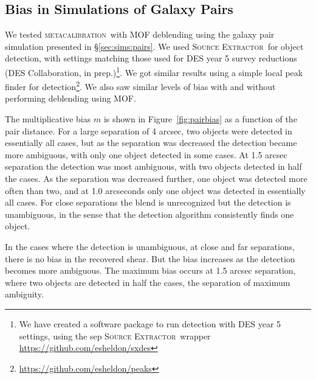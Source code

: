 \documentclass[iop, appendixfloats, numberedappendix, apj]{emulateapj}
\newcommand{\mcal}{\textsc{metacalibration}}
\newcommand{\sx}{\textsc{Source Extractor}}
\begin{document}
\subsection{Bias in Simulations of Galaxy Pairs}

We tested \mcal\ with MOF deblending using the galaxy pair simulation presented
in \S \ref{sec:sims:pairs}. We used \sx\ for object detection, with settings
matching those used for DES year 5 survey reductions (DES Collaboration, in
prep.)\footnote{We have created a software package to run detection with DES
year 5 settings, using the sep \sx\ wrapper
\url{https://github.com/esheldon/sxdes}}.  We got similar results using a
simple local peak finder for
detection\footnote{\url{https://github.com/esheldon/peaks}}.  We also saw
similar levels of bias with and without performing deblending using MOF.

The multiplicative bias $m$ is shown in Figure~\ref{fig:pairbias} as a function
of the pair distance. For a large separation of 4 arcsec, two objects were
detected in essentially all cases, but as the separation was decreased the
detection became more ambiguous, with only one object detected in some cases.
At 1.5 arcsec separation the detection was most ambiguous, with two objects
detected in half the cases. As the separation was decreased further, one object
was detected more often than two, and at 1.0 arcseconds only one object was
detected in essentially all cases.  For close separations the blend is
unrecognized but the detection is unambiguous, in the sense that the
detection algorithm consistently finds one object.

In the cases where the detection is unambiguous, at close and far separations,
there is no bias in the recovered shear.  But the bias increases as the
detection becomes more ambiguous. The maximum bias occurs at 1.5 arcsec
separation, where two objects are detected in half the cases, the separation of
maximum ambiguity.
\end{document}
